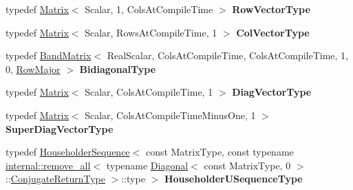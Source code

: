 \begin{DoxyCompactItemize}
typedef \hyperlink{group___core___module_class_eigen_1_1_matrix}{Matrix}$<$ Scalar, 1, Cols\+At\+Compile\+Time $>$ {\bfseries Row\+Vector\+Type}
\item 
\mbox{\label{class_eigen_1_1internal_1_1_upper_bidiagonalization_aa23c833f35d51d1175d3532fb27396bf}} 
typedef \hyperlink{group___core___module_class_eigen_1_1_matrix}{Matrix}$<$ Scalar, Rows\+At\+Compile\+Time, 1 $>$ {\bfseries Col\+Vector\+Type}
\item 
\mbox{\label{class_eigen_1_1internal_1_1_upper_bidiagonalization_a3ea5d3b9879d66c9a561a8979ad999f3}} 
typedef \hyperlink{group___core___module_class_eigen_1_1internal_1_1_band_matrix}{Band\+Matrix}$<$ Real\+Scalar, Cols\+At\+Compile\+Time, Cols\+At\+Compile\+Time, 1, 0, \hyperlink{group__enums_ggaacded1a18ae58b0f554751f6cdf9eb13acfcde9cd8677c5f7caf6bd603666aae3}{Row\+Major} $>$ {\bfseries Bidiagonal\+Type}
\item 
\mbox{\label{class_eigen_1_1internal_1_1_upper_bidiagonalization_adcf1dbaabda1d16ef09931c5bc2a71db}} 
typedef \hyperlink{group___core___module_class_eigen_1_1_matrix}{Matrix}$<$ Scalar, Cols\+At\+Compile\+Time, 1 $>$ {\bfseries Diag\+Vector\+Type}
\item 
\mbox{\label{class_eigen_1_1internal_1_1_upper_bidiagonalization_ad7491c3ca1a7985168c2c2b1dafe4ddf}} 
typedef \hyperlink{group___core___module_class_eigen_1_1_matrix}{Matrix}$<$ Scalar, Cols\+At\+Compile\+Time\+Minus\+One, 1 $>$ {\bfseries Super\+Diag\+Vector\+Type}
\item 
\mbox{\label{class_eigen_1_1internal_1_1_upper_bidiagonalization_a159f80e8c094ea6b53082ac9446923a8}} 
typedef \hyperlink{group___householder___module_class_eigen_1_1_householder_sequence}{Householder\+Sequence}$<$ const Matrix\+Type, const typename \hyperlink{struct_eigen_1_1internal_1_1remove__all}{internal\+::remove\+\_\+all}$<$ typename \hyperlink{group___core___module_class_eigen_1_1_diagonal}{Diagonal}$<$ const Matrix\+Type, 0 $>$\+::\hyperlink{class_eigen_1_1internal_1_1_tensor_lazy_evaluator_writable}{Conjugate\+Return\+Type} $>$\+::type $>$ {\bfseries Householder\+U\+Sequence\+Type}

\end{DoxyCompactItemize}
